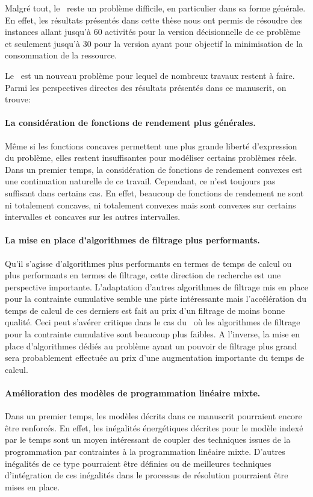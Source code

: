 Malgré tout, le \CECSP~reste un problème difficile, en particulier
dans sa forme générale. En effet, les résultats présentés dans cette
thèse nous ont permis de résoudre des instances allant jusqu'à $60$
activités pour la version décisionnelle de ce problème et seulement
jusqu'à $30$ pour la version ayant pour objectif la minimisation de la
consommation de la ressource. 

Le \CECSP~est un nouveau problème pour lequel de nombreux travaux
restent à faire. Parmi les perspectives directes des résultats
présentés dans ce manuscrit, on trouve:
\paragraph{La considération de fonctions de rendement plus générales.} Même si les fonctions concaves permettent une plus grande
  liberté d'expression du problème, elles restent insuffisantes pour
  modéliser certains problèmes réels. Dans un premier temps, la
  considération de fonctions de rendement convexes est une
  continuation naturelle de ce travail. Cependant, ce n'est toujours
pas suffisant dans certains cas. En effet, beaucoup de fonctions de
rendement ne sont ni totalement concaves, ni totalement convexes mais
sont convexes sur certains intervalles et concaves sur les autres
intervalles.

\paragraph{La mise en place d'algorithmes de filtrage plus
  performants.} Qu'il s'agisse d'algorithmes plus performants en termes
de temps de calcul ou plus performants en termes de filtrage, cette
direction de recherche est une perspective importante. L'adaptation
d'autres algorithmes de filtrage mis en place pour la contrainte
cumulative semble une piste intéressante mais l'accélération du temps
de calcul de ces derniers est fait au prix d'un filtrage de moins
bonne qualité. Ceci peut s'avérer critique dans le cas du \CECSP~où
les algorithmes de filtrage pour la contrainte cumulative sont
beaucoup plus faibles. A l'inverse, la mise en place d'algorithmes
dédiés au problème ayant un pouvoir de filtrage plus grand sera
probablement effectuée au prix d'une augmentation importante du temps 
de calcul. 

\paragraph{Amélioration des modèles de programmation linéaire mixte.}
Dans un premier temps, les modèles décrits dans ce manuscrit
pourraient encore être renforcés. En effet, les inégalités
énergétiques décrites pour le modèle indexé par le temps sont un moyen
intéressant de coupler des techniques issues de la programmation par
contraintes à la programmation linéaire mixte. D'autres inégalités de
ce type pourraient être définies ou de meilleures techniques
d'intégration de ces inégalités dans le processus de résolution
pourraient être mises en place. 

